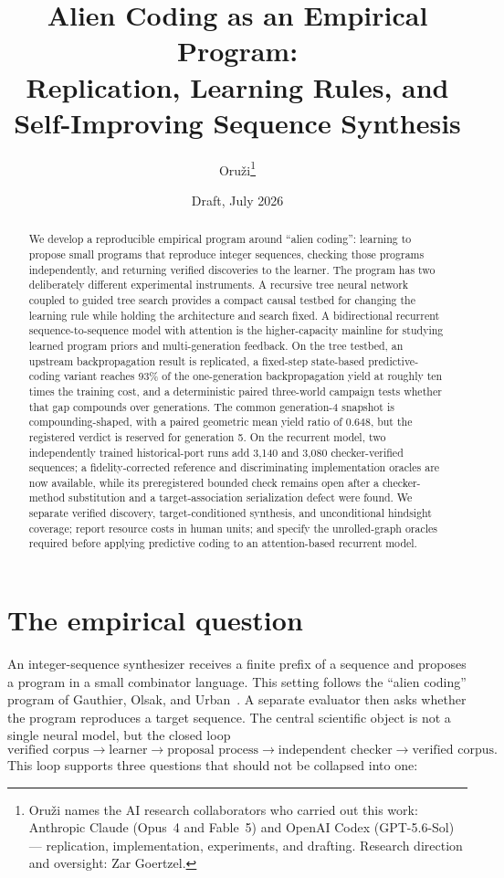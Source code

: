 \documentclass[11pt]{article}
\title{Alien Coding as an Empirical Program:\\
       Replication, Learning Rules, and Self-Improving Sequence Synthesis}
\author{Oru\v{z}i\thanks{Oru\v{z}i names the AI research collaborators who carried out
this work: Anthropic Claude (Opus~4 and Fable~5) and OpenAI Codex (GPT-5.6-Sol) ---
replication, implementation, experiments, and drafting. Research direction and
oversight: Zar Goertzel.}}
\date{Draft, July 2026}
\begin{document}
\maketitle

\begin{abstract}
We develop a reproducible empirical program around ``alien coding'': learning to propose
small programs that reproduce integer sequences, checking those programs independently,
and returning verified discoveries to the learner.  The program has two deliberately
different experimental instruments.  A recursive tree neural network coupled to guided
tree search provides a compact causal testbed for changing the learning rule while holding
the architecture and search fixed.  A bidirectional recurrent sequence-to-sequence model
with attention is the higher-capacity mainline for studying learned program priors and
multi-generation feedback.  On the tree testbed, an upstream backpropagation result is
replicated, a fixed-step state-based predictive-coding variant reaches 93\% of the one-generation
backpropagation yield at roughly ten times the training cost, and a deterministic paired
three-world campaign tests whether that gap compounds over generations.  The common
generation-4 snapshot is compounding-shaped, with a paired geometric mean yield ratio of
0.648, but the registered verdict is reserved for generation 5.  On the recurrent model,
two independently trained historical-port runs add 3,140 and 3,080 checker-verified
sequences; a fidelity-corrected reference and discriminating implementation oracles are
now available, while its preregistered bounded check remains open after a checker-method
substitution and a target-association serialization defect were found.  We separate
verified discovery, target-conditioned synthesis, and unconditional hindsight coverage;
report resource costs in human units; and specify the unrolled-graph oracles required
before applying predictive coding to an attention-based recurrent model.
\end{abstract}

\section{The empirical question}
\label{sec:intro}

An integer-sequence synthesizer receives a finite prefix of a sequence and proposes a
program in a small combinator language.  This setting follows the ``alien coding'' program
of Gauthier, Olsak, and Urban~\cite{aliencoding}.  A separate evaluator then asks whether
the program reproduces a target sequence.  The central scientific object is not a single
neural model, but the closed loop
\[
  \text{verified corpus}
  \longrightarrow \text{learner}
  \longrightarrow \text{proposal process}
  \longrightarrow \text{independent checker}
  \longrightarrow \text{verified corpus}.
\]
This loop supports three questions that should not be collapsed into one:
\end{document}
